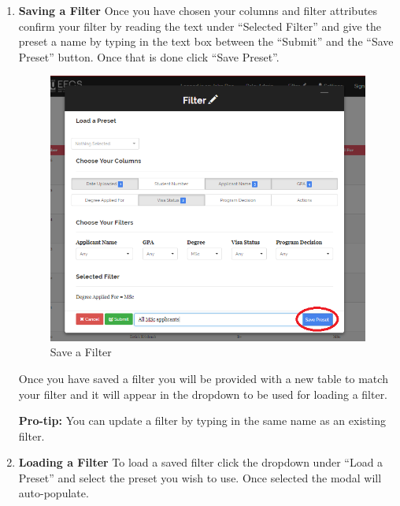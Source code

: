 \documentclass[fontsize=12pt,paper=letter,twoside]{scrartcl}
\begin{document}
\begin{enumerate}
\clearpage
\item \textbf{Saving a Filter} Once you have chosen your columns and filter attributes confirm your filter by reading the text under ``Selected Filter'' and give the preset a name by typing in the text box between the ``Submit'' and the ``Save Preset'' button. Once that is done click ``Save Preset''.

\begin{figure}[!htb]
\begin{center}
\includegraphics[width=.99\textwidth]{images/adm/ma/saving_preset.png}
\end{center}
\caption{Save a Filter}
\label{fig:adm/save_filter}
\end{figure}

\smallskip
\noindent Once you have saved a filter you will be provided with a new table to match your filter and it will appear in the dropdown to be used for loading a filter.

\smallskip
\noindent \textbf{Pro-tip:} You can update a filter by typing in the same name as an existing filter.

\clearpage
\item \textbf{Loading a Filter} To load a saved filter click the dropdown under ``Load a Preset'' and select the preset you wish to use. Once selected the modal will auto-populate.


\end{enumerate}
\end{document}
